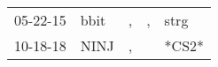 \begin{supertabular}{lllll}
 05-22-15 &  bbit &  , &  , &   strg \\
 10-18-18 &  NINJ &  , &    &  *CS2* \\
\end{supertabular}
